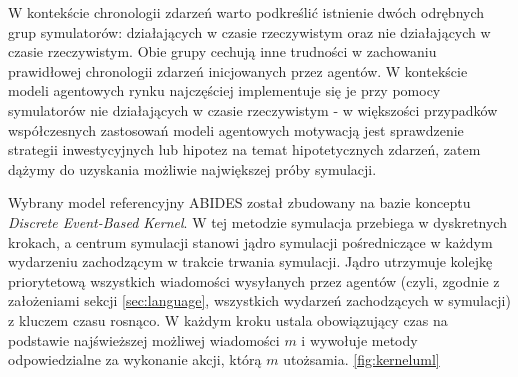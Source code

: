 W kontekście chronologii zdarzeń warto podkreślić istnienie dwóch odrębnych grup symulatorów: działających w czasie rzeczywistym oraz nie działających w czasie rzeczywistym. Obie grupy cechują inne trudności w zachowaniu prawidłowej chronologii zdarzeń inicjowanych przez agentów. W kontekście modeli agentowych rynku najczęściej implementuje się je przy pomocy symulatorów nie działających w czasie rzeczywistym - w większości przypadków współczesnych zastosowań modeli agentowych motywacją jest sprawdzenie strategii inwestycyjnych lub hipotez na temat hipotetycznych zdarzeń, zatem dążymy do uzyskania możliwie największej próby symulacji. 

Wybrany model referencyjny ABIDES został zbudowany na bazie konceptu \textit{Discrete Event-Based Kernel}\cite{handbook_of_simulation}. W tej metodzie symulacja przebiega w dyskretnych krokach, a centrum symulacji stanowi jądro symulacji pośredniczące w każdym wydarzeniu zachodzącym w trakcie trwania symulacji. Jądro utrzymuje kolejkę priorytetową wszystkich wiadomości wysyłanych przez agentów (czyli, zgodnie z założeniami sekcji \ref{sec:language}, wszystkich wydarzeń zachodzących w symulacji) z kluczem czasu rosnąco. W każdym kroku ustala obowiązujący czas na podstawie najświeższej możliwej wiadomości $m$ i wywołuje metody odpowiedzialne za wykonanie akcji, którą $m$ utożsamia. 
\ref{fig:kerneluml}
